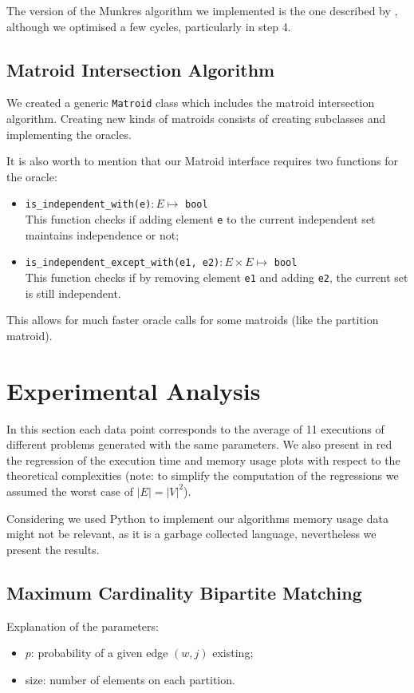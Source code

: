 \documentclass[a4,11pt]{article}
\begin{document}
The version of the Munkres algorithm we implemented is the one described by \textcite{r._a._pilgrim_munkres_nodate}, although we optimised a few cycles, particularly in step 4.

\subsection{Matroid Intersection Algorithm}
We created a generic \texttt{Matroid} class which includes the matroid intersection algorithm. Creating new kinds of matroids consists of creating subclasses and implementing the oracles.

It is also worth to mention that our Matroid interface requires two functions for the oracle:
\begin{itemize}
    \setlength\itemsep{-.1em}
    \item \texttt{is\_independent\_with(e)}$: E \mapsto $ \texttt{bool}\\
          This function checks if adding element \texttt{e} to the current independent set maintains independence or not;
    \item \texttt{is\_independent\_except\_with(e1, e2)}$: E \times E \mapsto $ \texttt{bool}\\
          This function checks if by removing element \texttt{e1} and adding \texttt{e2}, the current set is still independent.
\end{itemize}
This allows for much faster oracle calls for some matroids (like the partition matroid).

\section{Experimental Analysis}
In this section each data point corresponds to the average of 11 executions of different problems generated with the same parameters. We also present in red the regression of the execution time and memory usage plots with respect to the theoretical complexities (note: to simplify the computation of the regressions we assumed the worst case of $\left|E\right| = \left|V\right|^2$).

Considering we used Python to implement our algorithms memory usage data might not be relevant, as it is a garbage collected language, nevertheless we present the results.

\subsection{Maximum Cardinality Bipartite Matching} \label{rmbm}
Explanation of the parameters:
\begin{itemize}
    \setlength\itemsep{-.1em}
    \item $p$: probability of a given edge $(w,j)$ existing;
    \item size: number of elements on each partition.
\end{itemize}
\end{document}
